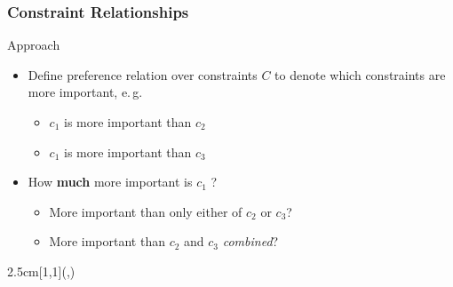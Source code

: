 \begin{frame}
\frametitle{Constraint Relationships}

Approach~\cite{Schiendorfer13}
\begin{itemize}
  \item Define preference relation over constraints $C$ to denote which constraints are \alert{more important}, e.\,g.
\begin{itemize}
  \item $c_1$ is more important than $c_2$

  \item $c_1$ is more important than $c_3$
\end{itemize}

\vspace*{2ex}
\item How \textbf{much} more important is $c_1$ ?
\begin{itemize}
\item More important than only either of $c_2$ or $c_3$?
\item More important than $c_2$ and $c_3$ \emph{combined}?
\end{itemize}
\end{itemize}


\begin{textblock*}{2.5cm}[1,1](\textwidth-0.5cm,\textheight-3.63cm)
\end{textblock*}

\end{frame}

